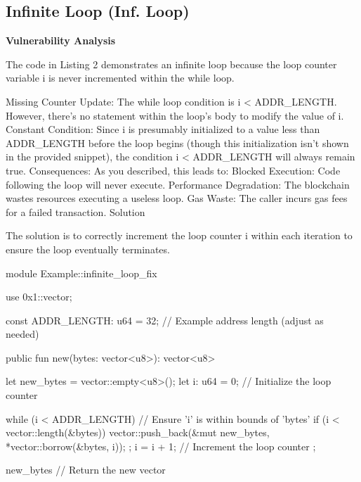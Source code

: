 \begin{boxE}
    \subsection{ Infinite Loop (Inf. Loop)}
    \begin{boxB}
        \textbf{Vulnerability Analysis}

The code in Listing 2 demonstrates an infinite loop because the loop counter variable i is never incremented within the while loop.

Missing Counter Update: The while loop condition is i < ADDR\_LENGTH. However, there's no statement within the loop's body to modify the value of i.
Constant Condition: Since i is presumably initialized to a value less than ADDR\_LENGTH before the loop begins (though this initialization isn't shown in the provided snippet), the condition i < ADDR\_LENGTH will always remain true.
Consequences: As you described, this leads to:
Blocked Execution: Code following the loop will never execute.
Performance Degradation: The blockchain wastes resources executing a useless loop.
Gas Waste: The caller incurs gas fees for a failed transaction.
Solution

The solution is to correctly increment the loop counter i within each iteration to ensure the loop eventually terminates.
    \end{boxB}
    \begin{boxL}
        module Example::infinite\_loop\_fix {
    use 0x1::vector;

    const ADDR\_LENGTH: u64 = 32; // Example address length (adjust as needed)

    public fun new(bytes: vector<u8>): vector<u8> {
        let new\_bytes = vector::empty<u8>();
        let i: u64 = 0; // Initialize the loop counter

        while (i < ADDR\_LENGTH) {
            // Ensure 'i' is within bounds of 'bytes'
            if (i < vector::length(\&bytes)) {
              vector::push\_back(\&mut new\_bytes, *vector::borrow(\&bytes, i));
            };
            i = i + 1; // Increment the loop counter
        };

        new\_bytes // Return the new vector
    }
}
    \end{boxL}
\end{boxE}